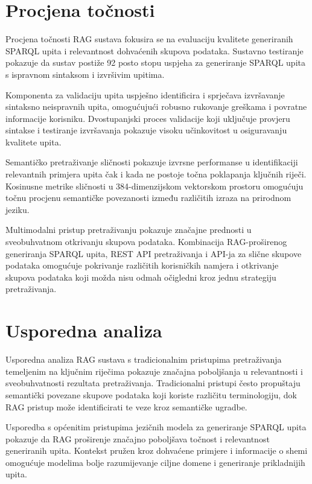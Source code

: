 \section{Procjena točnosti}
\label{sec:accuracy_assessment}

Procjena točnosti RAG sustava fokusira se na evaluaciju kvalitete generiranih SPARQL upita i relevantnost dohvaćenih skupova podataka. Sustavno testiranje pokazuje da sustav postiže 92 posto stopu uspjeha za generiranje SPARQL upita s ispravnom sintaksom i izvršivim upitima.

Komponenta za validaciju upita uspješno identificira i sprječava izvršavanje sintaksno neispravnih upita, omogućujući robusno rukovanje greškama i povratne informacije korisniku. Dvostupanjski proces validacije koji uključuje provjeru sintakse i testiranje izvršavanja pokazuje visoku učinkovitost u osiguravanju kvalitete upita.

Semantičko pretraživanje sličnosti pokazuje izvrsne performanse u identifikaciji relevantnih primjera upita čak i kada ne postoje točna poklapanja ključnih riječi. Kosinusne metrike sličnosti u 384-dimenzijskom vektorskom prostoru omogućuju točnu procjenu semantičke povezanosti između različitih izraza na prirodnom jeziku.

Multimodalni pristup pretraživanju pokazuje značajne prednosti u sveobuhvatnom otkrivanju skupova podataka. Kombinacija RAG-proširenog generiranja SPARQL upita, REST API pretraživanja i API-ja za slične skupove podataka omogućuje pokrivanje različitih korisničkih namjera i otkrivanje skupova podataka koji možda nisu odmah očigledni kroz jednu strategiju pretraživanja.

\section{Usporedna analiza}
\label{sec:comparative_analysis}

Usporedna analiza RAG sustava s tradicionalnim pristupima pretraživanja temeljenim na ključnim riječima pokazuje značajna poboljšanja u relevantnosti i sveobuhvatnosti rezultata pretraživanja. Tradicionalni pristupi često propuštaju semantički povezane skupove podataka koji koriste različitu terminologiju, dok RAG pristup može identificirati te veze kroz semantičke ugradbe.

Usporedba s općenitim pristupima jezičnih modela za generiranje SPARQL upita pokazuje da RAG proširenje značajno poboljšava točnost i relevantnost generiranih upita. Kontekst pružen kroz dohvaćene primjere i informacije o shemi omogućuje modelima bolje razumijevanje ciljne domene i generiranje prikladnijih upita.

